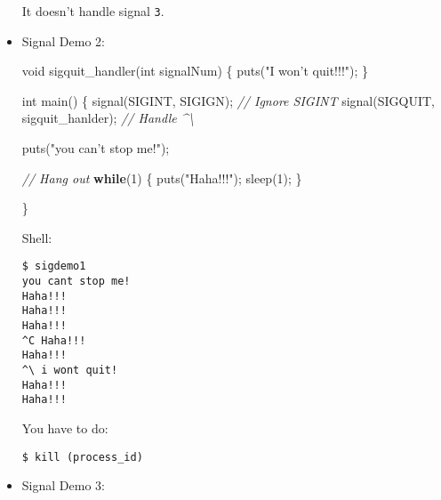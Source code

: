 \documentclass[]{article}
\newenvironment{Shaded}{}{}
\newcommand{\DataTypeTok}[1]{\textcolor[rgb]{0.56,0.13,0.00}{#1}}
\newcommand{\DecValTok}[1]{\textcolor[rgb]{0.25,0.63,0.44}{#1}}
\newcommand{\StringTok}[1]{\textcolor[rgb]{0.25,0.44,0.63}{#1}}
\newcommand{\CommentTok}[1]{\textcolor[rgb]{0.38,0.63,0.69}{\textit{#1}}}
\newcommand{\ControlFlowTok}[1]{\textcolor[rgb]{0.00,0.44,0.13}{\textbf{#1}}}
\newcommand{\NormalTok}[1]{#1}
\begin{document}
\begin{itemize}
  It doesn't handle signal \texttt{3}.
\item
  Signal Demo 2:

\begin{Shaded}
\begin{Highlighting}[]
\DataTypeTok{void}\NormalTok{ sigquit_handler(}\DataTypeTok{int}\NormalTok{ signalNum) \{}
\NormalTok{    puts(}\StringTok{"I won't quit!!!"}\NormalTok{);}
\NormalTok{\}}

\DataTypeTok{int}\NormalTok{ main() \{}
\NormalTok{    signal(SIGINT, SIGIGN);				}\CommentTok{// Ignore SIGINT}
\NormalTok{    signal(SIGQUIT, sigquit_hanlder);	}\CommentTok{// Handle ^\textbackslash{}}

\NormalTok{    puts(}\StringTok{"you can't stop me!"}\NormalTok{);}

    \CommentTok{// Hang out}
    \ControlFlowTok{while}\NormalTok{(}\DecValTok{1}\NormalTok{) \{}
\NormalTok{        puts(}\StringTok{"Haha!!!"}\NormalTok{);}
\NormalTok{        sleep(}\DecValTok{1}\NormalTok{);}
\NormalTok{    \}}

\NormalTok{\}}
\end{Highlighting}
\end{Shaded}

  Shell:

\begin{verbatim}
$ sigdemo1
you cant stop me!
Haha!!!
Haha!!!
Haha!!!
^C Haha!!!
Haha!!!
^\ i wont quit!
Haha!!!
Haha!!!
\end{verbatim}

  You have to do:

\begin{verbatim}
$ kill (process_id)
\end{verbatim}
\item
  Signal Demo 3:

\begin{Shaded}
\end{Shaded}
\end{itemize}
\end{document}
